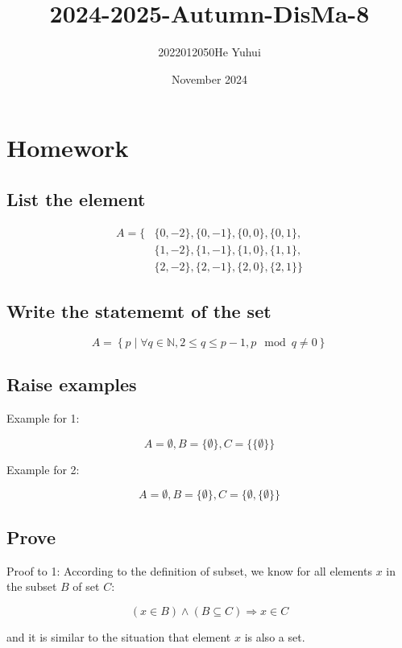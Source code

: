 \documentclass{article}
\title{2024-2025-Autumn-DisMa-8}
\author{2022012050\quad He Yuhui}
\date{November 2024}
\begin{document}
\maketitle

\section{Homework}

\subsection{List the element}

$$
    \begin{aligned}
        A=\{&\{0,-2\},\{0,-1\},\{0,0\},\{0,1\},\\
          &\{1,-2\},\{1,-1\},\{1,0\},\{1,1\},\\
          &\{2,-2\},\{2,-1\},\{2,0\},\{2,1\}\}
    \end{aligned}
$$

\subsection{Write the statememt of the set}

$$
    A=\left\{p\mid\forall q\in\mathbb{N},2\leq q\leq p-1,p\mod q\neq 0\right\}
$$

\subsection{Raise examples}

\quad

Example for 1:

$$
    A=\emptyset,B=\{\emptyset\},C=\{\{\emptyset\}\}
$$

Example for 2:

$$
    A=\emptyset,B=\{\emptyset\},C=\{\emptyset,\{\emptyset\}\}
$$

\subsection{Prove}

\quad

Proof to 1: According to the definition of subset, we know for all elements $x$ in the subset $B$ of set $C$:

$$
    (x\in B)\land (B\subseteq C)\Rightarrow x\in C
$$

and it is similar to the situation that element $x$ is also a set.
\end{document}
